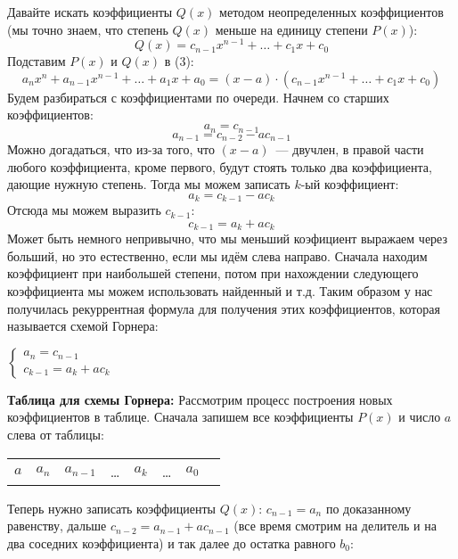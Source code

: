 \documentclass[russian]{lecture-notes}
\theoremstyle{definition}
\begin{document}
	Давайте искать коэффициенты $Q(x)$ методом неопределенных коэффициентов (мы точно знаем, что степень $Q(x)$ меньше на единицу степени $P(x)$):
	\[
		Q(x) = c_{n-1}x^{n-1} + \ldots + c_1x + c_0
	\]
	Подставим $P(x)$ и $Q(x)$ в (3):
	\[
		a_nx^n + a_{n-1}x^{n-1} + \ldots + a_1x + a_0 = (x-a) \cdot (c_{n-1}x^{n-1} + \ldots + c_1x + c_0)
	\]
	Будем разбираться с коэффициентами по очереди. Начнем со старших коэффициентов:
	\[
		a_n = c_{n-1}
	\]
	\[
		a_{n-1} = c_{n-2} - ac_{n-1}
	\]
	Можно догадаться, что из-за того, что $(x-a)$~--- двучлен, в правой части любого коэффициента, кроме первого, будут стоять только два коэффициента, дающие нужную степень. Тогда мы можем записать $k$-ый коэффициент:
	\[
		a_k = c_{k-1} - ac_{k}
	\]
	Отсюда мы можем выразить $c_{k-1}$:
	\[
		c_{k-1} = a_k + ac_k
	\]
	Может быть немного непривычно, что мы меньший коэфициент выражаем через больший, но это естественно, если мы идём слева направо. Сначала находим коэффициент при наибольшей степени, потом при нахождении следующего коэффициента мы можем использовать найденный и т.д. Таким образом у нас получилась рекуррентная формула для получения этих коэффициентов, которая называется схемой Горнера:
	
	$\begin{cases}
		a_n = c_{n-1}\\
		c_{k-1} = a_k + ac_k
	\end{cases}$
	
	\noindent\textbf{Таблица для схемы Горнера:} 
	Рассмотрим процесс построения новых коэффициентов в таблице.
	Сначала запишем все коэффициенты $P(x)$ и число $a$ слева от таблицы:
	\begin{table}[H]
		\centering
		\begin{tabular}{c|c|c|c|c|c|c|c}
			$a$ & $a_n$ & $a_{n-1}$ & \ldots & $a_k$ & \ldots & $a_0$
		\end{tabular}
	\end{table}

	Теперь нужно записать коэффициенты $Q(x)$: $c_{n-1} = a_{n}$ по доказанному равенству, дальше $c_{n-2} = a_{n-1} + ac_{n-1}$ (все время смотрим на делитель и на два соседних коэффициента) и так далее до остатка равного $b_0$:
	\begin{table}[H]
		\centering
	\end{table}
	
\end{document}
